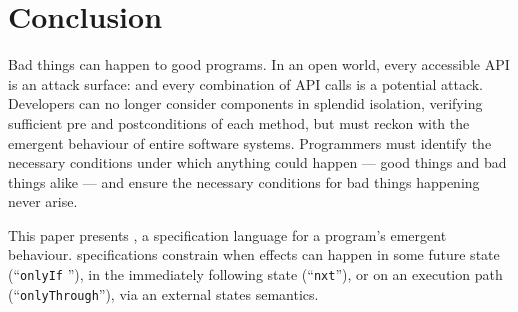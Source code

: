 \section{Conclusion}
\label{s:conclusion}

Bad things can happen to good programs. In an open world, every
accessible API is an attack surface: and every combination of
API calls is a potential attack.  Developers can no longer consider
components in splendid isolation, verifying sufficient pre and
postconditions of each method, but must reckon with the emergent
behaviour of entire software systems. Programmers
must identify the necessary conditions under which anything could
happen \cite{anything} --- good things and bad things alike --- and
ensure the necessary conditions for bad things happening never arise.



This paper presents 
\Nec, a specification language for a program's
emergent behaviour.
\Nec specifications
constrain when effects can happen in some future state
(``\texttt{\color{blue}onlyIf} ''),
in the immediately following state (``\texttt{\color{blue}nxt}''), or
on an execution path 
(``\texttt{\color{blue}onlyThrough}''), via an external states
semantics.



 
